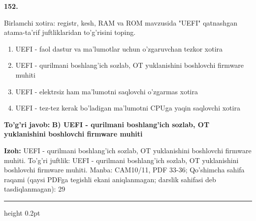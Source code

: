 \documentclass[10pt,a4paper]{article}
\begin{document}
{\bfseries\sffamily\color{ink} 152.}
\par
Birlamchi xotira: registr, kesh, RAM va ROM mavzusida "UEFI" qatnashgan atama-ta'rif juftliklaridan to'g'risini toping.
\begin{enumerate}[label=\Alph*),leftmargin=9mm]
\item UEFI - faol dastur va ma'lumotlar uchun o'zgaruvchan tezkor xotira
\item UEFI - qurilmani boshlang'ich sozlab, OT yuklanishini boshlovchi firmware muhiti
\item UEFI - elektrsiz ham ma'lumotni saqlovchi o'zgarmas xotira
\item UEFI - tez-tez kerak bo'ladigan ma'lumotni CPUga yaqin saqlovchi xotira
\end{enumerate}
\begin{tcolorbox}[enhanced,breakable,colback=teal!4,colframe=teal!60!black,boxrule=0.45pt,arc=1.2mm,left=2.7mm,right=2.7mm,top=1.8mm,bottom=1.8mm,before skip=2mm,after skip=2mm]
{\bfseries\sffamily\color{teal}To'g'ri javob:} \textbf{B) UEFI - qurilmani boshlang'ich sozlab, OT yuklanishini boshlovchi firmware muhiti}
\par\smallskip
{\bfseries Izoh:} UEFI - qurilmani boshlang'ich sozlab, OT yuklanishini boshlovchi firmware muhiti. To'g'ri juftlik: UEFI - qurilmani boshlang'ich sozlab, OT yuklanishini boshlovchi firmware muhiti. Manba: CAM10/11, PDF 33-36; Qo'shimcha sahifa raqami (qaysi PDFga tegishli ekani aniqlanmagan; darslik sahifasi deb tasdiqlanmagan): 29
\end{tcolorbox}
\vspace{2mm}\hrule height 0.2pt\vspace{3mm}
\end{document}
